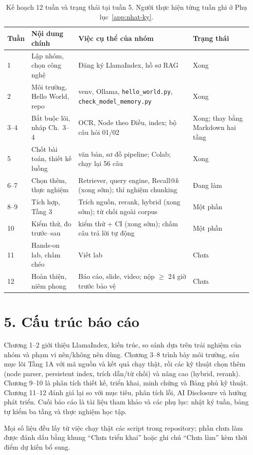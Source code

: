 \begin{table}[H]
  \centering
  \small
  \begin{tabularx}{\textwidth}{l >{\hsize=0.9\hsize}X >{\hsize=1.3\hsize}X >{\hsize=0.8\hsize}X}
    \toprule
    \textbf{Tuần} & \textbf{Nội dung chính} & \textbf{Việc cụ thể của nhóm} & \textbf{Trạng thái} \\
    \midrule
    1 & Lập nhóm, chọn công nghệ & Đăng ký LlamaIndex, hồ sơ RAG & Xong \\
    2 & Môi trường, Hello World, repo & venv, Ollama, \texttt{hello\_world.py}, \texttt{check\_model\_memory.py} & Xong \\
    3--4 & Bắt buộc lõi, nháp Ch.~3--4 & OCR, Node theo Điều, index; bộ câu hỏi 01/02 & Xong; thay bằng Markdown hai tầng \\
    5 & Chốt bài toán, thiết kế luồng & 6 văn bản, sơ đồ pipeline; Colab; chạy lại 56 câu & Xong \\
    6--7 & Chọn thêm, thực nghiệm & Retriever, query engine, Recall@$k$ (xong sớm); thí nghiệm chunking & Đang làm \\
    8--9 & Tích hợp, Tầng 3 & Trích nguồn, rerank, hybrid (xong sớm); từ chối ngoài corpus & Một phần \\
    10 & Kiểm thử, đo trước--sau & 26 kiểm thử + CI (xong sớm); chấm câu trả lời tự động & Một phần \\
    11 & Hands-on lab, chấm chéo & Viết lab & Chưa \\
    12 & Hoàn thiện, niêm phong & Báo cáo, slide, video; nộp $\ge$ 24 giờ trước bảo vệ & Chưa \\
    \bottomrule
  \end{tabularx}
  \caption{Kế hoạch 12 tuần và trạng thái tại tuần 5. Người thực hiện từng tuần ghi ở Phụ lục~\ref{app:nhat-ky}.}
\end{table}

\section*{5. Cấu trúc báo cáo}

Chương 1--2 giới thiệu LlamaIndex, kiến trúc, so sánh dựa trên trải nghiệm của nhóm
và phạm vi nên/không nên dùng. Chương 3--8 trình bày môi trường, sáu mục lõi Tầng 1A
với mã nguồn và kết quả chạy thật, rồi các kỹ thuật chọn thêm (node parser, persistent index, trích
dẫn/từ chối) và nâng cao (hybrid, rerank). Chương 9--10 là phân tích thiết kế, triển
khai, minh chứng và Bảng phủ kỹ thuật. Chương 11--12 đánh giá lại so với mục tiêu, phân
tích lỗi, AI Disclosure và hướng phát triển. Cuối báo cáo là tài liệu tham khảo và các phụ lục: nhật ký
tuần, bảng tự kiểm ba tầng và thực nghiệm học tập.

Mọi số liệu đều lấy từ việc chạy thật các script trong repository; phần chưa làm được đánh dấu bằng
khung ``Chưa triển khai'' hoặc ghi chú ``Chưa làm'' kèm thời điểm dự kiến bổ sung.
